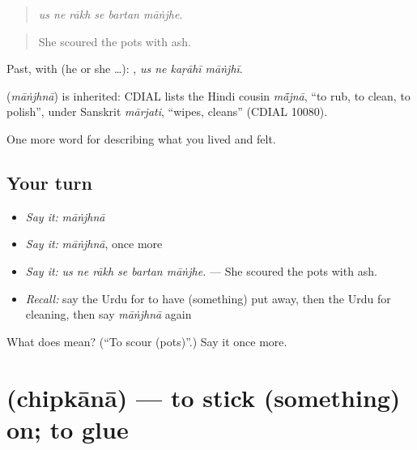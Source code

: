 \begin{quote}
     
\end{quote}

\begin{quote}
\emph{us ne rākh se bartan māṅjhe.}
\end{quote}

\begin{quote}
She scoured the pots with ash.
\end{quote}

Past, with  (he or she …):    , \emph{us ne kaṛāhī māṅjhī}.

\begin{cousinweb}
\textbf{} (\emph{māṅjhnā}) is inherited: CDIAL lists the Hindi cousin \emph{mā̃jnā}, \textquotedblleft{}to rub, to clean, to polish\textquotedblright{}, under Sanskrit \emph{mārjati}, \textquotedblleft{}wipes, cleans\textquotedblright{} (CDIAL 10080).
\end{cousinweb}

\begin{grammarlens}[title={What you've built}]
One more word for describing what you lived and felt.
\end{grammarlens}

\subsection*{Your turn}
\begin{itemize}
\raggedright
  \item \emph{Say it:} \emph{māṅjhnā}
  \item \emph{Say it:} \emph{māṅjhnā}, once more
  \item \emph{Say it:} \emph{us ne rākh se bartan māṅjhe.} — She scoured the pots with ash.
  \item \emph{Recall:} say the Urdu for to have (something) put away, then the Urdu for cleaning, then say \emph{māṅjhnā} again
\end{itemize}

\begin{tcolorbox}[breakable,colback=teal!4,colframe=teal!35!black,title={Before you move on}]
What does  mean? (\textquotedblleft{}To scour (pots)\textquotedblright{}.) Say it once more.
\end{tcolorbox}
\section[\texorpdfstring{\ur{چپکانا} (chipkānā)}{چپکانا (chipkānā)}]{ (chipkānā) — to stick (something) on; to glue}

